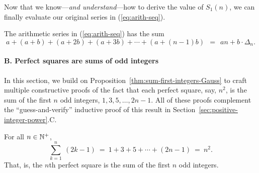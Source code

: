 \noindent {}
\medskip

Now that we know---{\em and understand}---how to derive the value of
$S_1(n)$, we can finally evaluate our original series in
(\ref{eq:arith-seq}).  

\begin{prop}
\label{thm:sum-of-arithmetic-series}
The arithmetic series in (\ref{eq:arith-seq}) has the sum
\begin{equation}
\label{eq:sum-arithmetic-series}
a + (a+b) + (a+2b) + (a+3b) + \cdots + (a+(n-1)b) \ \ = \ \
an + b \cdot \Delta_n. 
\end{equation}
\end{prop}


\paragraph{\small\sf B. Perfect squares are sums of odd integers}

In this section, we build on
Proposition~\ref{thm:sum-first-integers-Gauss} to craft multiple
constructive proofs of the fact that each perfect square, say, $n^2$,
is the sum of the first $n$ odd integers, $1, 3, 5, \ldots, 2n-1$.
All of these proofs complement the ``guess-and-verify'' inductive
proof of this result in Section~\ref{sec:positive-integer-power}.C.

\begin{prop}
\label{thm:squares-odd-integers-Gauss}
For all $n \in \mathbb{N}^+$,
\begin{equation}
\label{eq:sum-of-odds}
\sum_{k=1}^n \ (2k-1)
 \ = \ 1 + 3 + 5 + \cdots + (2n-1) \ = \ n^2.
\end{equation}
That, is, the $n$th perfect square is the sum of the first $n$ odd
integers.
\end{prop}

